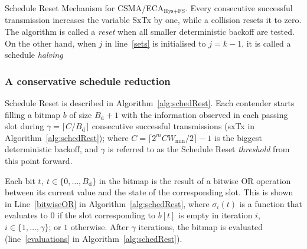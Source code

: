 		
			\begin{algorithm}[tb]
		\vspace{0.2cm}
		\caption{Schedule Reset Mechanism for CSMA/ECA$_{\text{Hys+FS}}$. Every consecutive successful transmission increases the variable SxTx by one, while a collision resets it to zero. The algorithm is called a \emph{reset} when all smaller deterministic backoff are tested. On the other hand, when $j$ in line~\ref{sets} is initialised to $j=k-1$, it is called a schedule \emph{halving}}\label{alg:schedRest}
	\end{algorithm}
		
		
		\subsubsection{A conservative schedule reduction}
		Schedule Reset is described in Algorithm~\ref{alg:schedRest}. Each contender starts filling a bitmap $b$ of size $B_{\text{d}}+1$ with the information observed in each passing slot during $\gamma=\lceil C/B_{\text{d}}\rceil$ consecutive successful transmissions (sxTx in Algorithm~\ref{alg:schedRest}); where $C=\lceil 2^{m}CW_{\min}/2\rceil-1$ is the biggest deterministic backoff, and $\gamma$ is referred to as the Schedule Reset \emph{threshold} from this point forward.
		
		Each bit $t,~t\in\{0,\ldots ,B_{\text{d}}\}$ in the bitmap is the result of a bitwise OR operation between its current value and the state of the corresponding slot. This is shown in Line~\ref{bitwiseOR} in Algorithm~\ref{alg:schedRest}, where $\sigma_{i}(t)$ is a function that evaluates to $0$ if the slot corresponding to $b[t]$ is empty in iteration $i$, $i \in\{1,\ldots,\gamma\}$; or $1$ otherwise. After $\gamma$ iterations, the bitmap is evaluated (line~\ref{evaluations} in Algorithm~\ref{alg:schedRest}).
		
